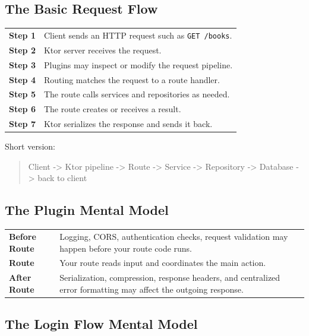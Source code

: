 \documentclass[11pt,a4paper]{article}
\begin{document}
\subsection{The Basic Request Flow}

\begin{longtable}{p{} p{}}
\textbf{Step 1} & Client sends an HTTP request such as \texttt{GET /books}. \\
\textbf{Step 2} & Ktor server receives the request. \\
\textbf{Step 3} & Plugins may inspect or modify the request pipeline. \\
\textbf{Step 4} & Routing matches the request to a route handler. \\
\textbf{Step 5} & The route calls services and repositories as needed. \\
\textbf{Step 6} & The route creates or receives a result. \\
\textbf{Step 7} & Ktor serializes the response and sends it back. \\
\end{longtable}

Short version:

\begin{quote}
Client -> Ktor pipeline -> Route -> Service -> Repository -> Database -> back to client
\end{quote}

\subsection{The Plugin Mental Model}

\begin{longtable}{p{} p{}}
\textbf{Before Route} & Logging, CORS, authentication checks, request validation may happen before your route code runs. \\
\textbf{Route} & Your route reads input and coordinates the main action. \\
\textbf{After Route} & Serialization, compression, response headers, and centralized error formatting may affect the outgoing response. \\
\end{longtable}

\subsection{The Login Flow Mental Model}
\end{document}
